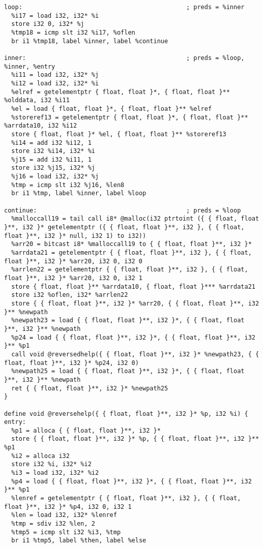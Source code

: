 \documentclass[main.tex]{subfiles}
\begin{document}
{\begin{lstlisting}
loop:                                             ; preds = %inner
  %i17 = load i32, i32* %i
  store i32 0, i32* %j
  %tmp18 = icmp slt i32 %i17, %oflen
  br i1 %tmp18, label %inner, label %continue

inner:                                            ; preds = %loop, %inner, %entry
  %i11 = load i32, i32* %j
  %i12 = load i32, i32* %i
  %elref = getelementptr { float, float }*, { float, float }** %olddata, i32 %i11
  %el = load { float, float }*, { float, float }** %elref
  %storeref13 = getelementptr { float, float }*, { float, float }** %arrdata10, i32 %i12
  store { float, float }* %el, { float, float }** %storeref13
  %i14 = add i32 %i12, 1
  store i32 %i14, i32* %i
  %j15 = add i32 %i11, 1
  store i32 %j15, i32* %j
  %j16 = load i32, i32* %j
  %tmp = icmp slt i32 %j16, %len8
  br i1 %tmp, label %inner, label %loop

continue:                                         ; preds = %loop
  %malloccall19 = tail call i8* @malloc(i32 ptrtoint ({ { float, float }**, i32 }* getelementptr ({ { float, float }**, i32 }, { { float, float }**, i32 }* null, i32 1) to i32))
  %arr20 = bitcast i8* %malloccall19 to { { float, float }**, i32 }*
  %arrdata21 = getelementptr { { float, float }**, i32 }, { { float, float }**, i32 }* %arr20, i32 0, i32 0
  %arrlen22 = getelementptr { { float, float }**, i32 }, { { float, float }**, i32 }* %arr20, i32 0, i32 1
  store { float, float }** %arrdata10, { float, float }*** %arrdata21
  store i32 %oflen, i32* %arrlen22
  store { { float, float }**, i32 }* %arr20, { { float, float }**, i32 }** %newpath
  %newpath23 = load { { float, float }**, i32 }*, { { float, float }**, i32 }** %newpath
  %p24 = load { { float, float }**, i32 }*, { { float, float }**, i32 }** %p1
  call void @reversedhelp({ { float, float }**, i32 }* %newpath23, { { float, float }**, i32 }* %p24, i32 0)
  %newpath25 = load { { float, float }**, i32 }*, { { float, float }**, i32 }** %newpath
  ret { { float, float }**, i32 }* %newpath25
}

define void @reversehelp({ { float, float }**, i32 }* %p, i32 %i) {
entry:
  %p1 = alloca { { float, float }**, i32 }*
  store { { float, float }**, i32 }* %p, { { float, float }**, i32 }** %p1
  %i2 = alloca i32
  store i32 %i, i32* %i2
  %i3 = load i32, i32* %i2
  %p4 = load { { float, float }**, i32 }*, { { float, float }**, i32 }** %p1
  %lenref = getelementptr { { float, float }**, i32 }, { { float, float }**, i32 }* %p4, i32 0, i32 1
  %len = load i32, i32* %lenref
  %tmp = sdiv i32 %len, 2
  %tmp5 = icmp slt i32 %i3, %tmp
  br i1 %tmp5, label %then, label %else


\end{lstlisting}}
\end{document}
